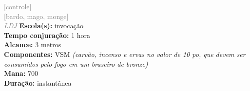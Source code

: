 \documentclass{RPG_Adventure}[2021/10/20]
\begin{document}
{\scriptsize \textcolor{gray}{[controle]\\}}
{\scriptsize \textcolor{gray}{[bardo, mago, monge]\\}}
{\tiny \textcolor{gray}{\textit{LDJ}}}
{\small \t \textbf{Escola(s):} invocação\\\t \textbf{Tempo conjuração:} 1 hora\\\t \textbf{Alcance:} 3 metros\\\t \textbf{Componentes:} VSM \textit{(carvão, incenso e ervas no valor de 10 po, que devem ser consumidos pelo fogo em um braseiro de bronze)}\\\t \textbf{Mana:} 700\\\t \textbf{Duração:} instantânea\\}
\end{document}
